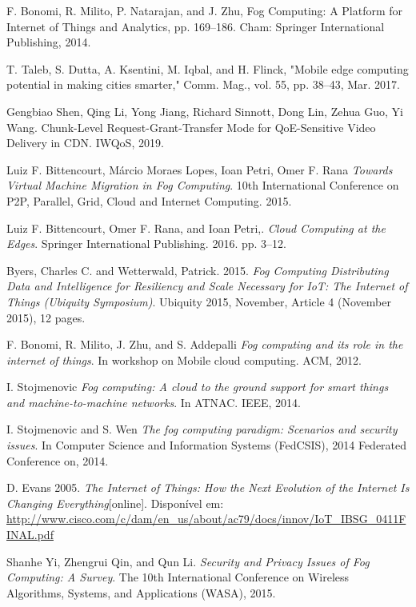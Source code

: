 \documentclass[a4paper, 11pt]{article}
\begin{document}
\begin{thebibliography}{11}

 F. Bonomi, R. Milito, P. Natarajan, and J. Zhu, Fog Computing: A Platform for Internet of Things and Analytics, pp. 169–186. Cham: Springer International Publishing, 2014.

 T. Taleb, S. Dutta, A. Ksentini, M. Iqbal, and H. Flinck, "Mobile edge computing potential in making cities smarter," Comm. Mag., vol. 55, pp. 38–43, Mar. 2017.

 Gengbiao Shen, Qing Li, Yong Jiang, Richard Sinnott, Dong Lin, Zehua Guo, Yi Wang. Chunk-Level Request-Grant-Transfer Mode for QoE-Sensitive Video Delivery in CDN. IWQoS, 2019.

 Luiz F. Bittencourt, Márcio Moraes Lopes, Ioan Petri, Omer F. Rana \emph{Towards Virtual Machine Migration in Fog Computing}. 10th International Conference on P2P, Parallel, Grid, Cloud and Internet Computing. 2015.

 Luiz F. Bittencourt, Omer F. Rana, and Ioan Petri,. \emph{Cloud Computing at the Edges}. Springer International Publishing. 2016. pp. 3–12.

  Byers, Charles C. and Wetterwald, Patrick. 2015. \emph{Fog Computing Distributing Data and Intelligence for Resiliency and Scale Necessary for IoT: The Internet of Things (Ubiquity Symposium)}. Ubiquity 2015, November, Article 4 (November 2015), 12 pages.

 F. Bonomi, R. Milito, J. Zhu, and S. Addepalli \emph{Fog computing and its role in the internet of things}. In workshop on Mobile cloud computing. ACM, 2012.

 I. Stojmenovic \emph{Fog computing: A cloud to the ground support for smart things and machine-to-machine networks}. In ATNAC. IEEE, 2014.

 I. Stojmenovic and S. Wen \emph{The fog computing paradigm: Scenarios and security issues}. In Computer Science and Information Systems (FedCSIS), 2014 Federated Conference on, 2014.

  D. Evans 2005. \emph{The Internet of Things: How the Next Evolution of the Internet Is Changing Everything}[online]. Disponível em: \url{http://www.cisco.com/c/dam/en_us/about/ac79/docs/innov/IoT_IBSG_0411FINAL.pdf}

  Shanhe Yi, Zhengrui Qin, and Qun Li. \emph{Security and Privacy Issues of Fog Computing: A Survey}. The 10th International Conference on Wireless Algorithms, Systems, and Applications (WASA), 2015.



\end{thebibliography}
\end{document}
